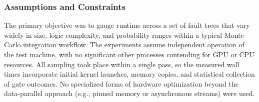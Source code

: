 \subsubsection*{Assumptions and Constraints}
The primary objective was to gauge runtime across a set of fault trees that vary widely in size, logic complexity, and probability ranges within a typical Monte Carlo integration workflow. The experiments assume independent operation of the test machine, with no significant other processes contending for GPU or CPU resources. All sampling took place within a single pass, so the measured wall times incorporate initial kernel launches, memory copies, and statistical collection of gate outcomes. No specialized forms of hardware optimization beyond the data-parallel approach (e.g., pinned memory or asynchronous streams) were used.